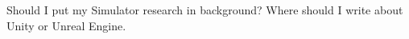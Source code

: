 Should I put my Simulator research in background?
Where should I write about Unity or Unreal Engine. 
